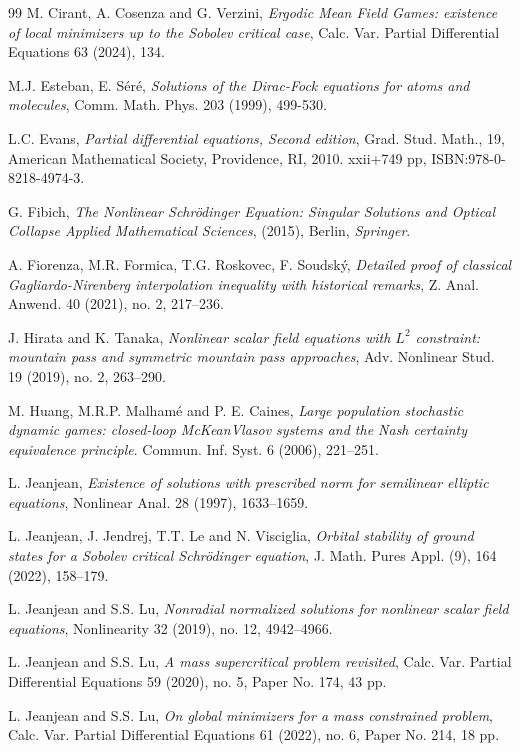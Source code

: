 \documentclass[11pt]{amsart}
\numberwithin{equation}{section}
\begin{document}
\begin{thebibliography}{99}
M. Cirant, A. Cosenza and G. Verzini, {\it Ergodic Mean Field Games: existence of local minimizers up to the Sobolev critical case}, Calc. Var. Partial Differential Equations 63 (2024), 134.

M.J. Esteban, E. S\'er\'e, {\it Solutions of the Dirac-Fock equations for atoms and molecules}, Comm. Math. Phys. 203 (1999), 499-530.

L.C. Evans, {\it Partial differential equations, Second edition}, Grad. Stud. Math., 19, American Mathematical Society, Providence, RI, 2010. xxii+749 pp, ISBN:978-0-8218-4974-3.

G. Fibich, {\it The Nonlinear Schr\"{o}dinger Equation: Singular Solutions and Optical Collapse Applied Mathematical
Sciences}, (2015), Berlin, \emph{Springer}.

A. Fiorenza, M.R. Formica, T.G. Roskovec, F. Soudsk\'y, {\it Detailed proof of classical Gagliardo-Nirenberg interpolation inequality with historical remarks}, Z. Anal. Anwend. 40 (2021), no. 2, 217--236.

 J. Hirata and K. Tanaka, {\it Nonlinear scalar field equations with $L^2$ constraint: mountain pass and symmetric mountain pass approaches}, Adv. Nonlinear Stud. 19 (2019), no. 2, 263--290.

M. Huang, M.R.P. Malham\'e and P. E. Caines, {\it Large population stochastic dynamic games: closed-loop McKeanVlasov systems and the Nash certainty equivalence principle}. Commun. Inf. Syst. 6 (2006), 221--251.

L. Jeanjean, {\it Existence of solutions with prescribed norm for semilinear elliptic equations}, Nonlinear Anal.  28 (1997), 1633--1659.

 L. Jeanjean, J. Jendrej, T.T. Le and N. Visciglia, {\it Orbital stability of ground states for a Sobolev critical
	Schr\"odinger equation}, J. Math. Pures Appl. (9), 164 (2022), 158--179.

 L. Jeanjean and S.S. Lu, {\it Nonradial normalized solutions for nonlinear scalar field equations}, Nonlinearity
32 (2019), no. 12, 4942--4966.

 L. Jeanjean and S.S. Lu,  {\it A mass supercritical problem revisited},  Calc.
Var. Partial Differential Equations 59 (2020), no. 5, Paper No. 174, 43 pp.

 L. Jeanjean and S.S. Lu, {\it On global minimizers for a mass constrained problem},
Calc. Var. Partial Differential Equations 61 (2022), no. 6, Paper No. 214, 18 pp.


\end{thebibliography}
\end{document}
